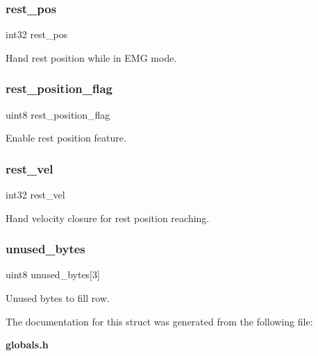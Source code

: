 \subsubsection{rest\+\_\+pos}
{\footnotesize\ttfamily int32 rest\+\_\+pos}

Hand rest position while in E\+MG mode. \mbox{\label{structst___s_h__spec_a8a4aa5efee4b9d62ea71a1459cf3ac3b}} 
\subsubsection{rest\+\_\+position\+\_\+flag}
{\footnotesize\ttfamily uint8 rest\+\_\+position\+\_\+flag}

Enable rest position feature. \mbox{\label{structst___s_h__spec_a94cdcf7b401877a792ba800585324d9c}} 
\subsubsection{rest\+\_\+vel}
{\footnotesize\ttfamily int32 rest\+\_\+vel}

Hand velocity closure for rest position reaching. \mbox{\label{structst___s_h__spec_aa1537c1e30116f5e2ee8dee11239a067}} 
\subsubsection{unused\+\_\+bytes}
{\footnotesize\ttfamily uint8 unused\+\_\+bytes[3]}

Unused bytes to fill row. 

The documentation for this struct was generated from the following file\+:\begin{DoxyCompactItemize}
\item 
\textbf{ globals.\+h}\end{DoxyCompactItemize}
